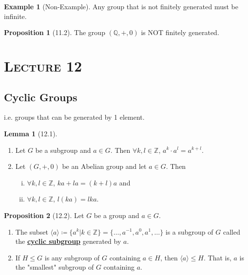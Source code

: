 \documentclass{article}
\newcommand{\Z}{\mathbb{Z}}
\newcommand{\Q}{\mathbb{Q}}
\newcommand{\coleq}{\coloneqq}
\newcommand{\inverse}[1]{#1^{-1}}
\newcommand{\define}[1]{\textbf{\underline{#1}}}
\newcommand{\gen}[1]{\langle#1\rangle}
\theoremstyle{definition}
\newtheorem*{prop}{Proposition}
\newtheorem*{ex}{Example}
\newtheorem*{lem}{Lemma}
\theoremstyle{remark}
\begin{document}
{        \begin{ex}[Non-Example]
            Any group that is not finitely generated must be infinite.
        \end{ex}
        
        \begin{prop}[11.2]
            The group $(\Q,+,0)$ is NOT finitely generated. 
        \end{prop}
    }
    
    \noindent\section*{\textbf{\textsc{Lecture 12}}}{
        \subsection*{Cyclic Groups}{
        i.e. groups that can be generated by 1 element.
        
        \begin{lem}[12.1]\hfill
            \begin{enumerate}
                \item Let $G$ be a subgroup and $a \in G$. Then $\forall k,l \in \Z$, $a^k\cdot a^l=a^{k+l}$.
                \item Let $(G,+,0)$ be an Abelian group and let $a \in G$. Then
                \begin{enumerate}[i.]
                    \item $\forall k,l \in \Z$, $ka+la=(k+l)a$ and
                    \item $\forall k,l \in \Z$, $l(ka)=lka$.
                \end{enumerate}
            \end{enumerate}
        \end{lem}
        
        \begin{prop}[12.2]
            Let $G$ be a group and $a \in G$.
            \begin{enumerate}
                \item The subset $\gen{a}\coleq \{a^k|k\in\Z\}=\{\ldots,\inverse{a},a^0,a^1,\ldots\}$ is a subgroup of $G$ called the \define{cyclic subgroup} generated by $a$.
                \item If $H\leq G$ is any subgroup of $G$ containing $a \in H$, then $\gen{a}\leq H$. That is, $a$ is the "smallest" subgroup of $G$ containing $a$.
            \end{enumerate}
        \end{prop}
        
}}
\end{document}
